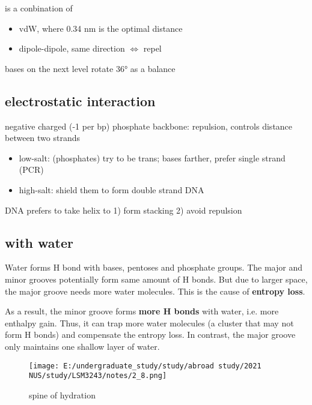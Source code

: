 is a conbination of

\begin{itemize}
\item
vdW, where 0.34 nm is the optimal distance
\item
dipole-dipole, same direction \(\Leftrightarrow\) repel
\end{itemize}

bases on the next level rotate \ang{36} as a balance

\hypertarget{electrostatic-interaction}{%
\subsection{electrostatic interaction}\label{electrostatic-interaction}}

negative charged (-1 per bp) phosphate backbone: repulsion, controls
distance between two strands

\begin{itemize}
\item
low-salt: (phosphates) try to be trans; bases farther, prefer single
strand (PCR)
\item
high-salt: shield them to form double strand DNA
\end{itemize}

DNA prefers to take helix to 1) form stacking 2) avoid repulsion

\hypertarget{with-water}{%
\subsection{with water}\label{with-water}}

Water forms H bond with bases, pentoses and phosphate groups. The major
and minor grooves potentially form same amount of H bonds. But due to
larger space, the major groove needs more water molecules. This is the
cause of \textbf{entropy loss}.

As a result, the minor groove forms \textbf{more H bonds} with water,
i.e. more enthalpy gain. Thus, it can trap more water molecules (a
cluster that may not form H bonds) and compensate the entropy loss. In
contrast, the major groove only maintains one shallow layer of water.

\begin{figure}
\centering
\texttt{[image: E:/undergraduate\_study/study/abroad study/2021 NUS/study/LSM3243/notes/2\_8.png]}
\caption*{spine of hydration}
\end{figure}

